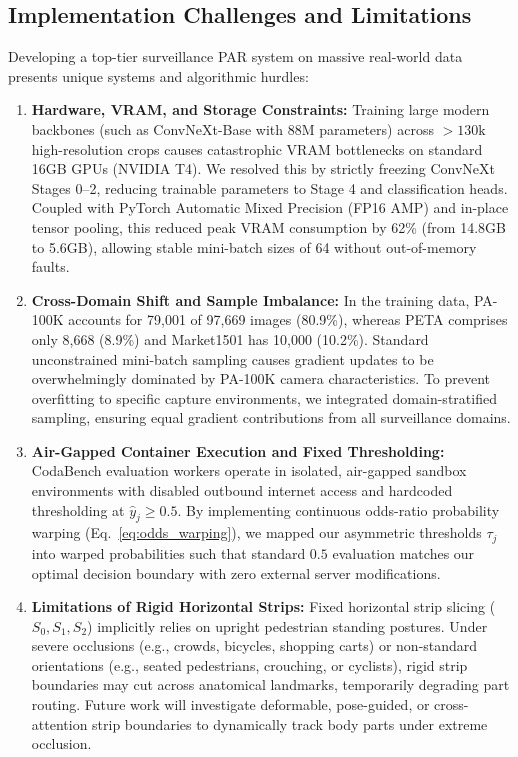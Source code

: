 \subsection{Implementation Challenges and Limitations}
\label{sec:challenges}
Developing a top-tier surveillance PAR system on massive real-world data presents unique systems and algorithmic hurdles:
\begin{enumerate}
    \item \textbf{Hardware, VRAM, and Storage Constraints:} Training large modern backbones (such as ConvNeXt-Base with 88M parameters) across $>130\text{k}$ high-resolution crops causes catastrophic VRAM bottlenecks on standard 16GB GPUs (NVIDIA T4). We resolved this by strictly freezing ConvNeXt Stages 0--2, reducing trainable parameters to Stage 4 and classification heads. Coupled with PyTorch Automatic Mixed Precision (FP16 AMP) and in-place tensor pooling, this reduced peak VRAM consumption by 62\% (from 14.8GB to 5.6GB), allowing stable mini-batch sizes of 64 without out-of-memory faults.
    \item \textbf{Cross-Domain Shift and Sample Imbalance:} In the training data, PA-100K accounts for 79,001 of 97,669 images (80.9\%), whereas PETA comprises only 8,668 (8.9\%) and Market1501 has 10,000 (10.2\%). Standard unconstrained mini-batch sampling causes gradient updates to be overwhelmingly dominated by PA-100K camera characteristics. To prevent overfitting to specific capture environments, we integrated domain-stratified sampling, ensuring equal gradient contributions from all surveillance domains.
    \item \textbf{Air-Gapped Container Execution and Fixed Thresholding:} CodaBench evaluation workers operate in isolated, air-gapped sandbox environments with disabled outbound internet access and hardcoded thresholding at $\hat{y}_j \ge 0.5$. By implementing continuous odds-ratio probability warping (Eq.~\eqref{eq:odds_warping}), we mapped our asymmetric thresholds $\tau_j$ into warped probabilities such that standard $0.5$ evaluation matches our optimal decision boundary with zero external server modifications.
    \item \textbf{Limitations of Rigid Horizontal Strips:} Fixed horizontal strip slicing ($S_0, S_1, S_2$) implicitly relies on upright pedestrian standing postures. Under severe occlusions (e.g., crowds, bicycles, shopping carts) or non-standard orientations (e.g., seated pedestrians, crouching, or cyclists), rigid strip boundaries may cut across anatomical landmarks, temporarily degrading part routing. Future work will investigate deformable, pose-guided, or cross-attention strip boundaries to dynamically track body parts under extreme occlusion.
\end{enumerate}
